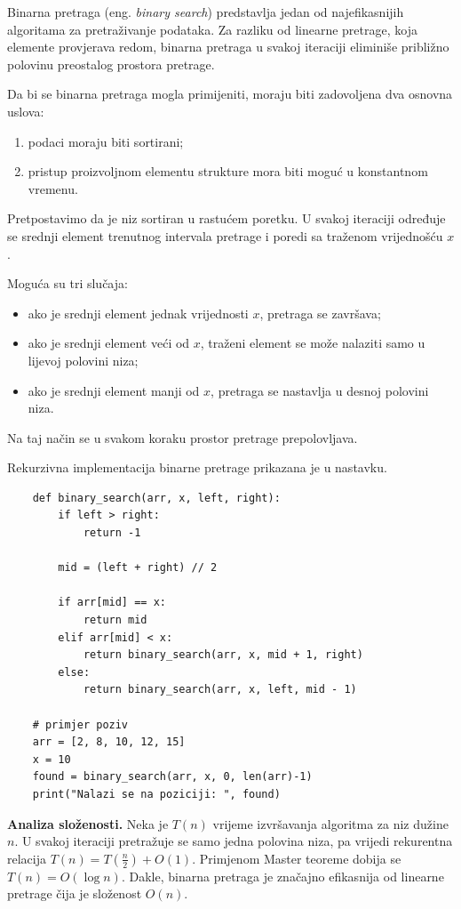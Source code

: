 Binarna pretraga (eng. \emph{binary search}) predstavlja jedan od najefikasnijih algoritama za pretraživanje podataka. Za razliku od linearne pretrage, koja elemente provjerava redom, binarna pretraga u svakoj iteraciji eliminiše približno polovinu preostalog prostora pretrage.

Da bi se binarna pretraga mogla primijeniti, moraju biti zadovoljena dva osnovna uslova:

\begin{enumerate}
	\item podaci moraju biti sortirani;
	\item pristup proizvoljnom elementu strukture mora biti moguć u konstantnom vremenu.
\end{enumerate}

Pretpostavimo da je niz sortiran u rastućem poretku. U svakoj iteraciji određuje se srednji element trenutnog intervala pretrage i poredi sa traženom vrijednošću $x$.

Moguća su tri slučaja:

\begin{itemize}
	\item ako je srednji element jednak vrijednosti $x$, pretraga se završava;
	\item ako je srednji element veći od $x$, traženi element se može nalaziti samo u lijevoj polovini niza;
	\item ako je srednji element manji od $x$, pretraga se nastavlja u desnoj polovini niza.
\end{itemize}

Na taj način se u svakom koraku prostor pretrage prepolovljava.

Rekurzivna implementacija binarne pretrage prikazana je u nastavku.

\begin{verbatim}
    def binary_search(arr, x, left, right):
        if left > right:
            return -1

        mid = (left + right) // 2

        if arr[mid] == x:
            return mid
        elif arr[mid] < x:
            return binary_search(arr, x, mid + 1, right)
        else:
            return binary_search(arr, x, left, mid - 1)
	
	# primjer poziv
	arr = [2, 8, 10, 12, 15]
	x = 10
	found = binary_search(arr, x, 0, len(arr)-1)
	print("Nalazi se na poziciji: ", found)
\end{verbatim}

\textbf{Analiza složenosti.} Neka je $T(n)$ vrijeme izvršavanja algoritma za niz dužine $n$. U svakoj iteraciji pretražuje se samo jedna polovina niza, pa vrijedi rekurentna relacija $T(n)=T\left(\frac{n}{2}\right)+O(1).$ Primjenom Master teoreme dobija se $T(n)=O(\log n).$ Dakle, binarna pretraga je značajno efikasnija od linearne pretrage čija je složenost $O(n)$.

